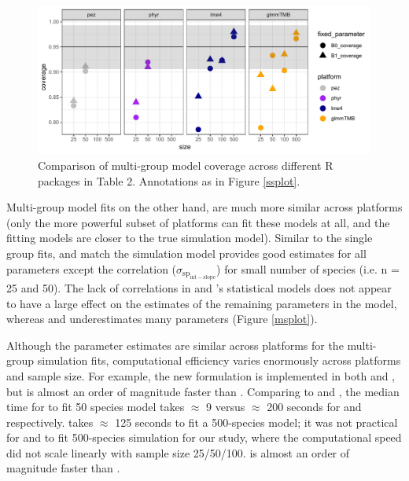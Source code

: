 \documentclass[12pt]{article}
\begin{document}
\begin{center}
\begin{figure}[H]
  \includegraphics[scale=0.8]{./figure/mscoverage.pdf}
  \caption{Comparison of multi-group model coverage across different R packages in Table 2. Annotations as in Figure \ref{ssplot}.}
  \label{msplot_coverage}
\end{figure}
\end{center}


Multi-group model fits on the other hand, are much more similar across platforms (only the more powerful subset of platforms can fit these models at all, and the fitting models are closer to the true simulation model).
Similar to the single group fits,  and  match the simulation model provides good estimates for all parameters except the correlation ($\sigma_{\mathrm{sp_{int-slope}}}$) for small number of species (i.e. n = 25 and 50).
The lack of correlations in  and 's statistical models does not appear to have a large effect on the estimates of the remaining parameters in the model, whereas  and  underestimates many parameters (Figure \ref{msplot}).

Although the parameter estimates are similar across platforms for the multi-group simulation fits, computational efficiency varies enormously across platforms and sample size.
For example, the new formulation is implemented in both  and , but  is almost an order of magnitude faster than .
Comparing  to  and , the median time for  to fit 50 species model takes $\approx$ 9 versus $\approx$ 200 seconds for  and  respectively. 
 takes $\approx$ 125 seconds to fit a 500-species model; it was not practical for  and  to fit 500-species simulation for our study, where the computational speed did not scale linearly with sample size 25/50/100.
 is almost an order of magnitude faster than .
\end{document}
